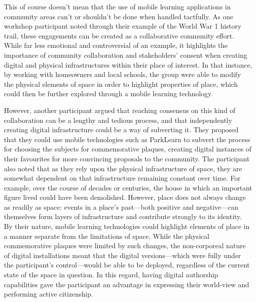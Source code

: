 This of course doesn't mean that the use of mobile learning applications in community areas can't or shouldn't be done when handled tactfully. As one workshop participant noted through their example of the World War 1 history trail, these engagements can be created as a collaborative community effort. While far less emotional and controversial of an example, it highlights the importance of community collaboration and stakeholders' consent when creating digital and physical infrastructures within their place of interest. In that instance, by working with homeowners and local schools, the group were able to modify the physical elements of space in order to highlight properties of place, which could then be further explored through a mobile learning technology. 

However, another participant argued that reaching consensus on this kind of collaboration can be a lengthy and tedious process, and that independently creating digital infrastructure could be a way of subverting it. They proposed that they could use mobile technologies such as ParkLearn to subvert the process for choosing the subjects for commemorative plaques, creating digital instances of their favourites for more convincing proposals to the community. The participant also noted that as they rely upon the physical infrastructure of space, they are somewhat dependent on that infrastructure remaining constant over time. For example, over the course of decades or centuries, the house in which an important figure lived could have been demolished. However, place does not always change as readily as space: events in a place's past---both positive and negative---can themselves form layers of infrastructure and contribute strongly to its identity. By their nature, mobile learning technologies could highlight elements of place in a manner separate from the limitations of space. While the physical commemorative plaques were limited by such changes, the non-corporeal nature of digital installations meant that the digital versions---which were fully under the participant's control---would be able to be deployed, regardless of the current state of the space in question. In this regard, having digital authorship capabilities gave the participant an advantage in expressing their world-view and performing active citizenship.

